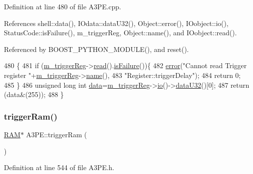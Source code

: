 Definition at line 480 of file A3\+P\+E.\+cpp.



References shell\+::data(), I\+Odata\+::data\+U32(), Object\+::error(), I\+Oobject\+::io(), Status\+Code\+::is\+Failure(), m\+\_\+trigger\+Reg, Object\+::name(), and I\+Oobject\+::read().



Referenced by B\+O\+O\+S\+T\+\_\+\+P\+Y\+T\+H\+O\+N\+\_\+\+M\+O\+D\+U\+L\+E(), and reset().


\begin{DoxyCode}
480                                \{
481   \textcolor{keywordflow}{if} (\hyperlink{classA3PE_a750158ae488121ab7969452f061e678c}{m\_triggerReg}->\hyperlink{classIOobject_aa07610c11963b1db6710e3c76ceea456}{read}().\hyperlink{classStatusCode_a5dd22dc6eb2c52fc4cabc58f6dea2eb7}{isFailure}())\{
482     \hyperlink{classObject_a204a95f57818c0f811933917a30eff45}{error}(\textcolor{stringliteral}{"Cannot read Trigger register "}+\hyperlink{classA3PE_a750158ae488121ab7969452f061e678c}{m\_triggerReg}->\hyperlink{classObject_a300f4c05dd468c7bb8b3c968868443c1}{name}(),
483         \textcolor{stringliteral}{"Register::triggerDelay"});
484     \textcolor{keywordflow}{return} 0;
485   \}
486   \textcolor{keywordtype}{unsigned} \textcolor{keywordtype}{long} \textcolor{keywordtype}{int} \hyperlink{namespaceshell_a5ea2525995cedc3efd69ea8a7f034d1e}{data}=\hyperlink{classA3PE_a750158ae488121ab7969452f061e678c}{m\_triggerReg}->\hyperlink{classIOobject_af04fb94137c3d86849f478ac5afab5d1}{io}()->\hyperlink{classIOdata_ab0e3cd09f46c1c3712f797116f6da074}{dataU32}()[0];
487   \textcolor{keywordflow}{return} (data&(255));
488 \}
\end{DoxyCode}
\mbox{\label{classA3PE_aad0f7ac467db22e5608ae6b0957665a1}} 
\subsubsection{\texorpdfstring{trigger\+Ram()}{triggerRam()}}
{\footnotesize\ttfamily \hyperlink{classRAM}{R\+AM}$\ast$ A3\+P\+E\+::trigger\+Ram (\begin{DoxyParamCaption}{ }\end{DoxyParamCaption})\hspace{0.3cm}{\ttfamily [inline]}}



Definition at line 544 of file A3\+P\+E.\+h.



